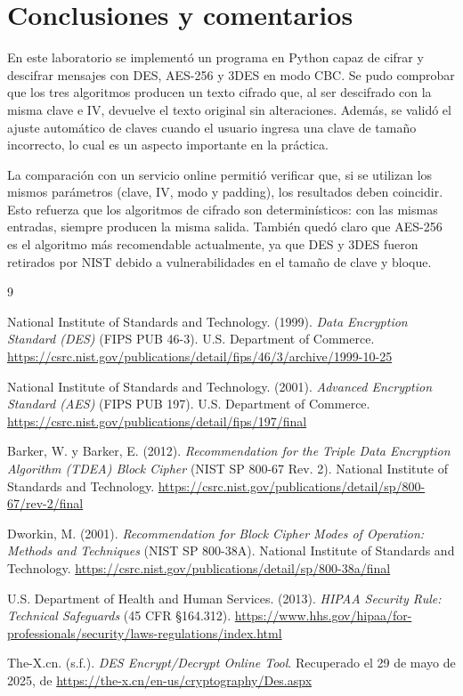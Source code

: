 \documentclass[letter,12pt]{article}
\begin{document}
\section*{Conclusiones y comentarios}

En este laboratorio se implementó un programa en Python capaz de cifrar y descifrar mensajes con DES, AES-256 y 3DES en modo CBC. Se pudo comprobar que los tres algoritmos producen un texto cifrado que, al ser descifrado con la misma clave e IV, devuelve el texto original sin alteraciones. Además, se validó el ajuste automático de claves cuando el usuario ingresa una clave de tamaño incorrecto, lo cual es un aspecto importante en la práctica.

La comparación con un servicio online permitió verificar que, si se utilizan los mismos parámetros (clave, IV, modo y padding), los resultados deben coincidir. Esto refuerza que los algoritmos de cifrado son determinísticos: con las mismas entradas, siempre producen la misma salida. También quedó claro que AES-256 es el algoritmo más recomendable actualmente, ya que DES y 3DES fueron retirados por NIST debido a vulnerabilidades en el tamaño de clave y bloque.

\begin{thebibliography}{9}

National Institute of Standards and Technology. (1999). \textit{Data Encryption Standard (DES)} (FIPS PUB 46-3). U.S. Department of Commerce. \url{https://csrc.nist.gov/publications/detail/fips/46/3/archive/1999-10-25}

National Institute of Standards and Technology. (2001). \textit{Advanced Encryption Standard (AES)} (FIPS PUB 197). U.S. Department of Commerce. \url{https://csrc.nist.gov/publications/detail/fips/197/final}

Barker, W. y Barker, E. (2012). \textit{Recommendation for the Triple Data Encryption Algorithm (TDEA) Block Cipher} (NIST SP 800-67 Rev. 2). National Institute of Standards and Technology. \url{https://csrc.nist.gov/publications/detail/sp/800-67/rev-2/final}

Dworkin, M. (2001). \textit{Recommendation for Block Cipher Modes of Operation: Methods and Techniques} (NIST SP 800-38A). National Institute of Standards and Technology. \url{https://csrc.nist.gov/publications/detail/sp/800-38a/final}

U.S. Department of Health and Human Services. (2013). \textit{HIPAA Security Rule: Technical Safeguards} (45 CFR §164.312). \url{https://www.hhs.gov/hipaa/for-professionals/security/laws-regulations/index.html}

The-X.cn. (s.f.). \textit{DES Encrypt/Decrypt Online Tool}. Recuperado el 29 de mayo de 2025, de \url{https://the-x.cn/en-us/cryptography/Des.aspx}

\end{thebibliography}
\end{document}

